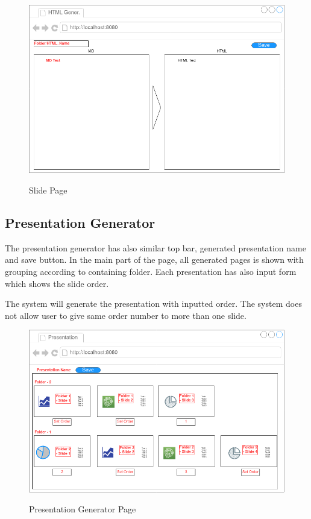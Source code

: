 \begin{figure}[h]
    \href{https://raw.githubusercontent.com/krmacit/SWE599-Project-Report-2021S-Macit-KerimCan/master/Mockups/MarkdownToHTML.png}{\includegraphics[scale=0.3]{Mockups/MarkdownToHTML.png}}
    \caption{Slide Page}
\end{figure}

\subsection{Presentation Generator}

The presentation generator has also similar top bar, generated presentation name and save button. In the main part of the page, all generated pages is shown with grouping according to containing folder. Each presentation has also input form which shows the slide order.

The system will generate the presentation with inputted order. The system does not allow user to give same order number to more than one slide.

\begin{figure}[h]
    \href{https://raw.githubusercontent.com/krmacit/SWE599-Project-Report-2021S-Macit-KerimCan/master/Mockups/PresentationGenerator.png}{\includegraphics[scale=0.3]{Mockups/PresentationGenerator.png}}
    \caption{Presentation Generator Page}
\end{figure}

